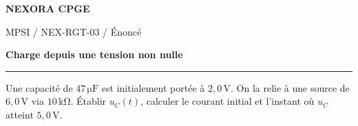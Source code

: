 \documentclass[11pt,a4paper]{article}
\begin{document}
{\small\bfseries\color{nexorablue} NEXORA CPGE}\par
{\small MPSI / NEX-RGT-03 / Énoncé}\par
{\LARGE\bfseries Charge depuis une tension non nulle}\par
\vspace{0.25em}\hrule\vspace{0.6em}

Une capacité de $47\,\mathrm{\mu F}$ est initialement portée à $2{,}0\,\mathrm V$. On la relie à une source de $6{,}0\,\mathrm V$ via $10\,\mathrm{k\Omega}$. Établir $u_C(t)$, calculer le courant initial et l’instant où $u_C$ atteint $5{,}0\,\mathrm V$.
\end{document}

